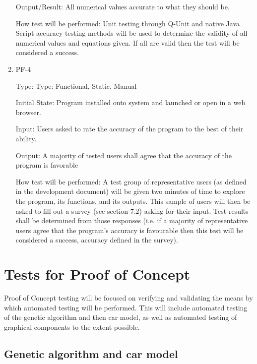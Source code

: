 \documentclass[12pt, titlepage]{article}
\begin{document}
\begin{enumerate}
Output/Result: All numerical values accurate to what they should be.
					
How test will be performed: Unit testing through Q-Unit and native Java Script accuracy testing methods will be used to determine the validity of all numerical values and equations given. If all are valid then the test will be considered a success.


\item{PF-4\\}

Type: Type: Functional, Static, Manual
					
Initial State: Program installed onto system and launched or open in a web browser.
					
Input: Users asked to rate the accuracy of the program to the best of their ability.
					
Output: A majority of tested users shall agree that the accuracy of the program is favorable
					
 How test will be performed: A test group of representative users (as defined in the development document) will be given two minutes of time to explore the program, its functions, and its outputs. This sample of users will then be asked to fill out a survey (see section 7.2) asking for their input. Test results shall be determined from those responses (i.e. if a majority of representative users agree that the program's accuracy is favourable then this test will be considered a success, accuracy defined in the survey).

\end{enumerate}

\section{Tests for Proof of Concept}

Proof of Concept testing will be focused on verifying and validating the means by which automated testing will be performed. This will include automated testing of the genetic algorithm and then car model, as well as automated testing of graphical components to the extent possible.

\subsection{Genetic algorithm and car model}
\end{document}
